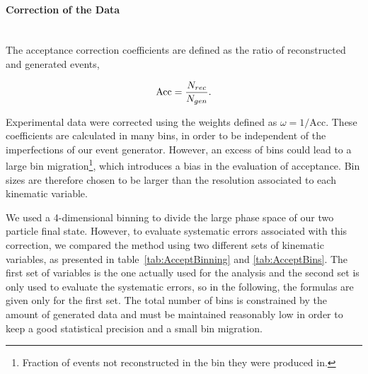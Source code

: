 \paragraph{Correction of the Data} ~\\
The acceptance correction coefficients are defined as the ratio of reconstructed and generated events,

\begin{equation}
\label{eq:acc}
\text{Acc} = {N_{rec} \over N_{gen}}.
\end{equation}

Experimental data were corrected using the weights defined as $\omega = 1/\text{Acc}$. These 
coefficients are calculated in many bins, in order to be independent of the imperfections of 
our event generator. However, an excess of bins could lead to a large bin 
migration\footnote{Fraction of events not reconstructed in the bin they were produced in.}, 
which introduces a bias in the evaluation of acceptance. Bin sizes are therefore chosen to
be larger than the resolution associated to each kinematic variable.

We used a 4-dimensional binning to divide the large phase space of our two particle final 
state. However, to evaluate systematic errors associated with this correction, we compared the
method using two different sets of kinematic variables, as presented in 
table~\ref{tab:AcceptBinning} and \ref{tab:AcceptBins}. The first set of variables is the one actually used for the
analysis and the second set is only used to evaluate the systematic errors, so in the 
following, the formulas are given only for the first set. The total number of bins is 
constrained by the amount of generated data and must be maintained reasonably low in order 
to keep a good statistical precision and a small bin migration.

